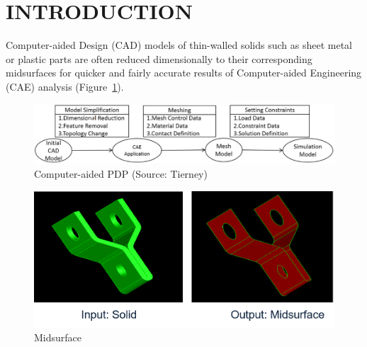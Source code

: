 \documentclass[9pt,academicons]{article}
\begin{document}
%






\section{INTRODUCTION}
Computer-aided Design (CAD) models of thin-walled solids such as sheet metal or plastic parts are often reduced dimensionally to their corresponding midsurfaces for quicker and fairly accurate results of Computer-aided Engineering (CAE) analysis (Figure~\ref{fig_cadcaeworkflow}).  

	\begin{figure} [!h]
		\centering
		\includegraphics[width=\linewidth,keepaspectratio]{images/Midcurve2}
		\caption{Computer-aided PDP (Source: Tierney\cite{Tierney2013})}
		\label{fig_cadcaeworkflow}
	\end{figure}
	



	\begin{figure} [!h]
		\centering
		\includegraphics[width=0.8\linewidth,keepaspectratio]{images/Midcurve5}
		\caption{Midsurface}
		\label{fig_midsurface}
	\end{figure}
	
\end{document}
